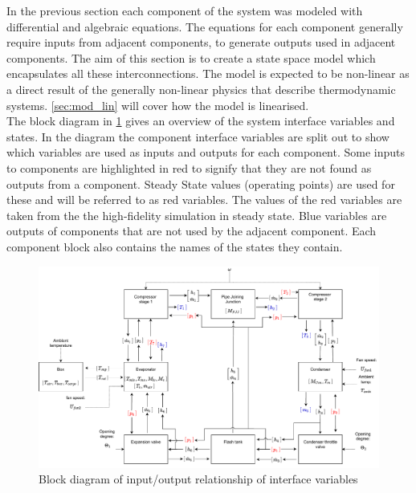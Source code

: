 
In the previous section each component of the system was modeled with differential and algebraic equations. The equations for each component generally require inputs from adjacent components, to generate outputs used in adjacent components. The aim of this section is to create a state space model which encapsulates all these interconnections. The model is expected to be non-linear as a direct result of the generally non-linear physics that describe thermodynamic systems. \cref{sec:mod_lin} will cover how the model is linearised.\\

The block diagram in \cref{fig:Block_diagram_inout} gives an overview of the system interface variables and states. In the diagram the component interface variables are split out to show which variables are used as inputs and outputs for each component. Some inputs to components are highlighted in red to signify that they are not found as outputs from a component. Steady State values (operating points) are used for these and will be referred to as red variables. The values of the red variables are taken from the the high-fidelity simulation in steady state. Blue variables are outputs of components that are not used by the adjacent component. Each component block also contains the names of the states they contain.

\begin{figure}[h!]
	\centering
	\includegraphics[width=1\textwidth]{Graphics/Block_Diagram_inout_flowValveVersion.pdf}
	\caption{Block diagram of input/output relationship of interface variables}
	\label{fig:Block_diagram_inout}
\end{figure}

